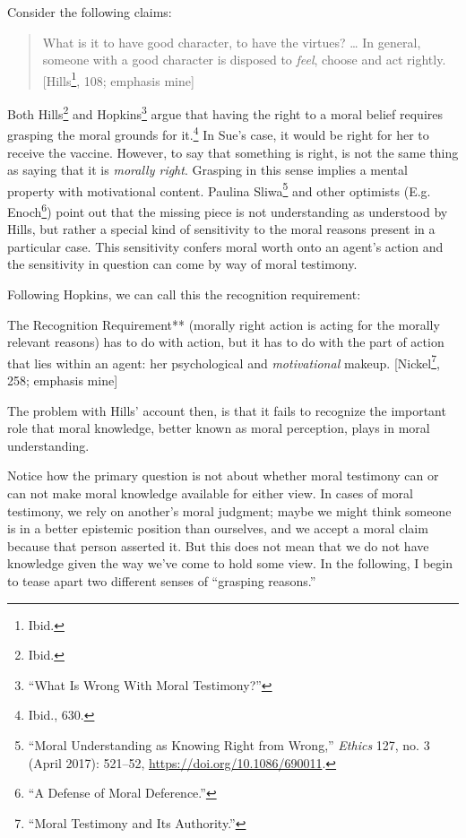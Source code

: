 \documentclass[phdthesis,12pt,final,a4paper]{wuthesis}
\theoremstyle{definition}
\theoremstyle{definition}
\theoremstyle{definition}
\theoremstyle{definition}
\theoremstyle{remark}
\begin{document}
\noindent Consider the following claims:

\begin{quote}
What is it to have good character, to have the virtues? \ldots{} In general, someone with a good character is disposed to \emph{feel}, choose and act rightly. {[}Hills\footnote{Ibid.}, 108; emphasis mine{]}
\end{quote}

Both Hills\footnote{Ibid.} and Hopkins\footnote{{``What {Is Wrong With Moral Testimony}?''}} argue that having the right to a moral belief requires grasping the moral grounds for it.\footnote{Ibid., 630.} In Sue's case, it would be right for her to receive the vaccine. However, to say that something is right, is not the same thing as saying that it is \emph{morally right}. Grasping in this sense implies a mental property with motivational content. Paulina Sliwa\footnote{{``Moral {Understanding} as {Knowing Right} from {Wrong},''} \emph{Ethics} 127, no. 3 (April 2017): 521--52, \url{https://doi.org/10.1086/690011}.} and other optimists (E.g. Enoch\footnote{{``A {Defense} of {Moral Deference}.''}}) point out that the missing piece is not understanding as understood by Hills, but rather a special kind of sensitivity to the moral reasons present in a particular case. This sensitivity confers moral worth onto an agent's action and the sensitivity in question can come by way of moral testimony.

Following Hopkins, we can call this the recognition requirement:

The Recognition Requirement** (morally right action is acting for the morally relevant reasons) has to do with action, but it has to do with the part of action that lies within an agent: her psychological and \emph{motivational} makeup. {[}Nickel\footnote{{``Moral {Testimony} and Its {Authority}.''}}, 258; emphasis mine{]}

The problem with Hills' account then, is that it fails to recognize the important role that moral knowledge, better known as moral perception, plays in moral understanding.

Notice how the primary question is not about whether moral testimony can or can not make moral knowledge available for either view. In cases of moral testimony, we rely on another's moral judgment; maybe we might think someone is in a better epistemic position than ourselves, and we accept a moral claim because that person asserted it. But this does not mean that we do not have knowledge given the way we've come to hold some view. In the following, I begin to tease apart two different senses of ``grasping reasons.''
\end{document}
